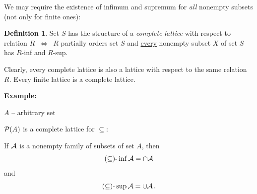 \documentclass[11pt,paper=b5,footinclude,headinclude]{scrbook} %
\def\inn {{~\wedge~}}
\def\sledi {{~\Rightarrow~}}
\def\cee {{~\Leftrightarrow~}}
\theoremstyle{remark}
\newtheorem*{corollary}{Corollary}
\theoremstyle{definition} %
\newtheorem*{definition}{Definition}
\theoremstyle{theorem} %
\newtheorem*{proposition}{Proposition}
\begin{document}
%
%
%
%
%
%
%
%
%
%


\medskip
%
%
We may require the existence of infimum and supremum for \emph{ all} nonempty subsets (not only for finite ones):

\begin{definition}
Set $S$ has the structure of a {\em complete lattice} with respect to relation $R$ $\cee$
$R$ partially orders set $S$ and \underline{every} nonempty subset $X$ of set $S$ has $R$-inf and $R$-sup.
\end{definition}

Clearly, every complete lattice is also a lattice with respect to the same relation $R$.
Every finite lattice is a complete lattice.

\bigskip
\textbf{ Example:}

$A$ -- arbitrary set

${\cal P}(A)$ is a complete lattice for $\subseteq$:

If ${\cal A}$ is a nonempty family of subsets of set $A$, then
$$(\subseteq)\textrm{-}\inf {\cal A} = \cap {\cal A}$$
and
$$(\subseteq)\textrm{-}\sup {\cal A} = \cup {\cal A}\,.$$
\end{document}
